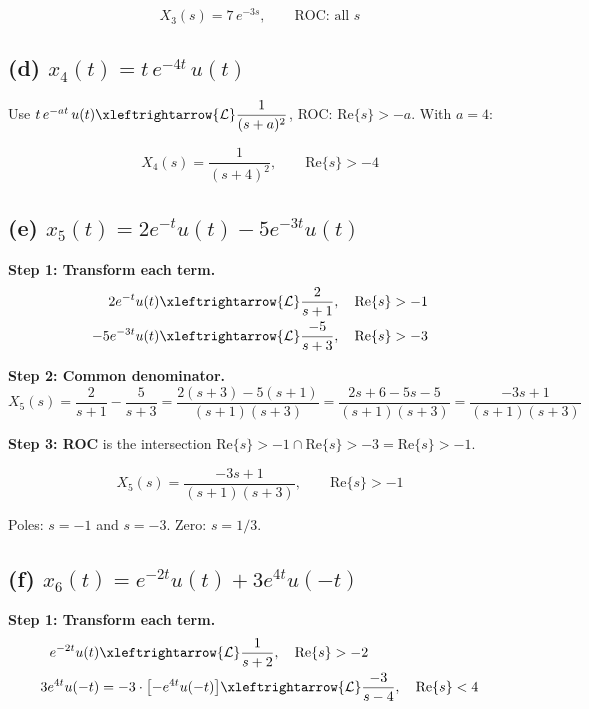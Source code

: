 \documentclass[11pt]{article}
\newcommand{\lt}{\xleftrightarrow{\mathcal{L}}}
\newcommand{\Res}{\mathrm{Re}}
\begin{document}
\begin{equation*}
\boxed{X_3(s) = 7\,e^{-3s}, \qquad \text{ROC: all } s}
\end{equation*}

\subsection*{(d) $x_4(t) = t\,e^{-4t}\,u(t)$}

Use $t\,e^{-at}\,u(t) \lt \dfrac{1}{(s+a)^2}$, ROC: $\Res\{s\} > -a$. With $a=4$:

\begin{equation*}
\boxed{X_4(s) = \frac{1}{(s+4)^2}, \qquad \Res\{s\} > -4}
\end{equation*}

\subsection*{(e) $x_5(t) = 2 e^{-t}u(t) - 5 e^{-3t}u(t)$}

\textbf{Step 1: Transform each term.}
\begin{align*}
2 e^{-t}u(t) &\lt \frac{2}{s+1}, \quad \Res\{s\} > -1 \\
-5 e^{-3t}u(t) &\lt \frac{-5}{s+3}, \quad \Res\{s\} > -3
\end{align*}

\textbf{Step 2: Common denominator.}
\[
X_5(s) = \frac{2}{s+1} - \frac{5}{s+3}
= \frac{2(s+3) - 5(s+1)}{(s+1)(s+3)}
= \frac{2s+6-5s-5}{(s+1)(s+3)}
= \frac{-3s+1}{(s+1)(s+3)}
\]

\textbf{Step 3: ROC} is the intersection $\Res\{s\}>-1 \cap \Res\{s\}>-3 = \Res\{s\}>-1$.

\begin{equation*}
\boxed{X_5(s) = \frac{-3s+1}{(s+1)(s+3)}, \qquad \Res\{s\} > -1}
\end{equation*}

Poles: $s = -1$ and $s = -3$. \quad Zero: $s = 1/3$.

\subsection*{(f) $x_6(t) = e^{-2t}u(t) + 3 e^{4t}u(-t)$}

\textbf{Step 1: Transform each term.}
\begin{align*}
e^{-2t}u(t) &\lt \frac{1}{s+2}, \quad \Res\{s\} > -2 \\
3 e^{4t}u(-t) &= -3\cdot\bigl[-e^{4t}u(-t)\bigr] \lt \frac{-3}{s-4}, \quad \Res\{s\} < 4
\end{align*}
\end{document}
